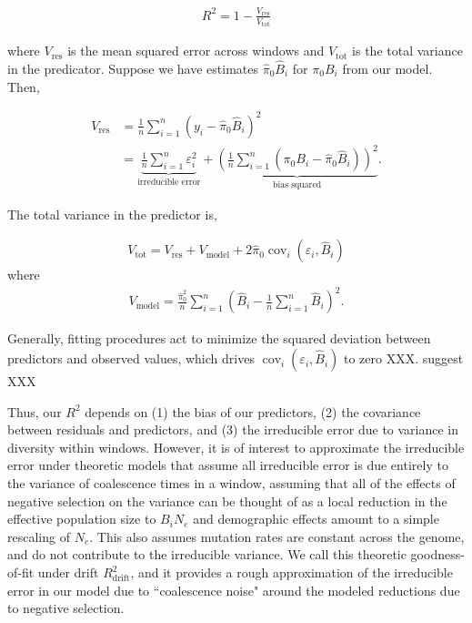 \documentclass[11pt]{article}
\DeclareMathOperator{\cov}{cov}
\begin{document}
\begin{align}
    R^2 = 1 - \frac{V_\text{res}}{V_\text{tot}}
\end{align}

where $V_\text{res}$ is the mean squared error across windows and
$V_\text{tot}$ is the total variance in the predicator. Suppose we have
estimates $\widehat{\pi}_0 \widehat{B}_i$ for $\pi_0 B_i$ from our model. Then,

\begin{align}
    V_\text{res} &= \frac{1}{n} \sum_{i=1}^n (y_i - \widehat{\pi}_0 \widehat{B}_i)^2  \\
                 &= \underbrace{\frac{1}{n} \sum_{i=1}^n \varepsilon_i^2}_\text{irreducible error} + \underbrace{\left(\frac{1}{n} \sum_{i=1}^n (\pi_0 B_i - \widehat{\pi}_0 \widehat{B}_i)\right)^2}_\text{bias squared}.
\end{align}

The total variance in the predictor is,

\begin{align}
    V_\text{tot} = V_\text{res} + V_\text{model} + 2\widehat{\pi}_0\cov_i(\varepsilon_i, \widehat{B}_i)
\end{align}
where 
\begin{align}
    V_\text{model} = \frac{\widehat{\pi}_0^2}{n} \sum_{i=1}^n \left(\widehat{B}_i - \frac{1}{n}\sum_{i=1}^n\widehat{B}_i\right)^2.
\end{align}

Generally, fitting procedures act to minimize the squared deviation between
predictors and observed values, which drives $\cov_i(\varepsilon_i,
\widehat{B}_i)$ to zero XXX. \textcite{Murphy2022-sj} suggest  XXX 

Thus, our $R^2$ depends on (1) the bias of our predictors, (2) the covariance
between residuals and predictors, and (3) the irreducible error due to variance
in diversity within windows. However, it is of interest to approximate the
irreducible error under theoretic models that assume all irreducible error is
due entirely to the variance of coalescence times in a window, assuming that
all of the effects of negative selection on the variance can be thought of as a
local reduction in the effective population size to $B_i N_e$ and demographic
effects amount to a simple rescaling of $N_e$. This also assumes mutation rates
are constant across the genome, and do not contribute to the irreducible
variance. We call this theoretic goodness-of-fit under drift
$R_\text{drift}^2$, and it provides a rough approximation of the irreducible
error in our model due to ``coalescence noise" around the modeled reductions
due to negative selection.
\end{document}
